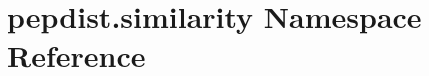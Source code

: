 \hypertarget{namespacepepdist_1_1similarity}{}\section{pepdist.\+similarity Namespace Reference}
\label{namespacepepdist_1_1similarity}
